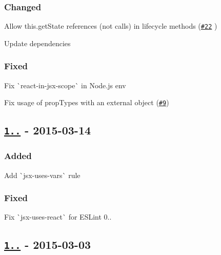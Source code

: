 \subsubsection*{Changed}


\begin{DoxyItemize}
\item Allow {\ttfamily this.\+get\+State} references (not calls) in lifecycle methods (\href{https://github.com/yannickcr/eslint-plugin-react/pull/22}{\tt \#22} )
\item Update dependencies
\end{DoxyItemize}

\subsubsection*{Fixed}


\begin{DoxyItemize}
\item Fix \`{}react-\/in-\/jsx-\/scope\`{} in Node.\+js env
\item Fix usage of prop\+Types with an external object (\href{https://github.com/yannickcr/eslint-plugin-react/issues/9}{\tt \#9})
\end{DoxyItemize}

\subsection*{\href{https://github.com/yannickcr/eslint-plugin-react/compare/v1.4.1...v1.5.0}{\tt 1..} -\/ 2015-\/03-\/14}

\subsubsection*{Added}


\begin{DoxyItemize}
\item Add \`{}jsx-\/uses-\/vars\`{} rule
\end{DoxyItemize}

\subsubsection*{Fixed}


\begin{DoxyItemize}
\item Fix \`{}jsx-\/uses-\/react\`{} for E\+S\+Lint 0..
\end{DoxyItemize}

\subsection*{\href{https://github.com/yannickcr/eslint-plugin-react/compare/v1.4.0...v1.4.1}{\tt 1..} -\/ 2015-\/03-\/03}

